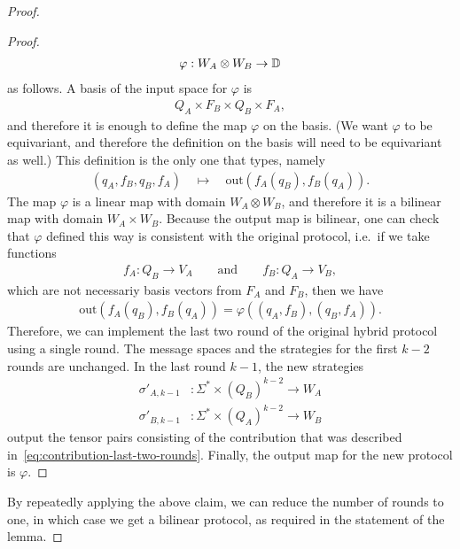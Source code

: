 \begin{theorem}
\begin{proof}
\begin{proof}
        \begin{align*}
        \varphi : W_A \otimes W_B \to \mathbb D
        \end{align*}
        as follows. A basis of the input space for $\varphi$ is 
        \begin{align*}
        Q_A \times F_B \times Q_B \times F_A,
        \end{align*}
        and therefore it is enough to define the map $\varphi$ on the basis. (We want $\varphi$ to be equivariant, and therefore the definition on the basis will need to be equivariant as well.) This definition is the only one that types, namely 
        \begin{align*}
        (q_A, f_B, q_B, f_A) \quad 
        \mapsto \quad 
        \text{out}(f_A(q_B), f_B(q_A)).
        \end{align*}
        The map $\varphi$ is a linear map with domain $W_A \otimes W_B$, and therefore it is a bilinear map with domain $W_A \times W_B$. Because the output map is bilinear, one can check that $\varphi$ defined this way is consistent with the original protocol, i.e.~if we take functions 
        \begin{align*}
        f_A : Q_B \to V_A \qquad \text{and} \qquad f_B : Q_A \to V_B,
        \end{align*}
        which are not necessariy basis vectors from $F_A$ and $F_B$, then we have 
        \begin{align*}
        \text{out}(f_A(q_B), f_B(q_A)) = \varphi((q_A, f_B), (q_B, f_A)).
        \end{align*}
        Therefore, we can implement the last two round of the original hybrid protocol using a single round. The message spaces and the strategies for the first $k-2$ rounds are unchanged. In the last round $k-1$, the new strategies
        \begin{align*}
        \sigma'_{A,k-1} & : \Sigma^* \times (Q_B)^{k-2} \to W_A\\
        \sigma'_{B,k-1} & : \Sigma^* \times (Q_A)^{k-2} \to W_B
        \end{align*}
        output the tensor pairs consisting of the contribution that was described in~\eqref{eq:contribution-last-two-rounds}. Finally, the output  map for the new protocol is $\varphi$. 
    \end{proof}

    By repeatedly applying the above claim, we can reduce the number of rounds to one, in which case we get a bilinear protocol, as required in the statement of the lemma. 
\end{proof}


\end{theorem}
